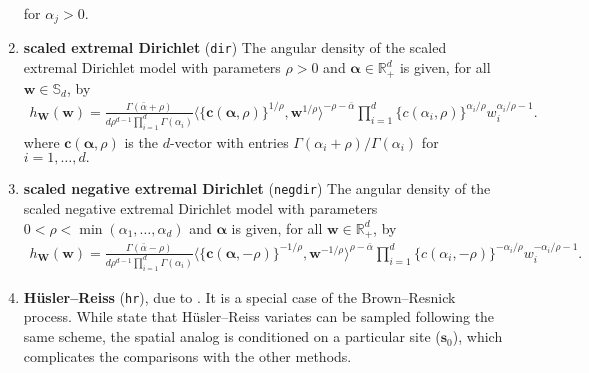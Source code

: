 \documentclass{article}
\newcommand{\bs}[1]{\boldsymbol {#1}}
\newcommand{\R}{\mathbb{R}}
\newcommand{\code}[1]{\texttt{#1}}
\begin{document}
\begin{enumerate}
for $\alpha_j>0.$ 
\item \textbf{scaled extremal Dirichlet} (\code{dir})
The angular density of the scaled extremal Dirichlet model with parameters $\rho >0$ and $\bs{\alpha} \in \R^{d}_{+}$ is given, for all $\bs{w} \in \mathbb{S}_d$, by
\begin{align*}
	h_{\bs{W}}(\bs{w})=\frac{\Gamma(\bar{\alpha}+\rho)}{d\rho^{d-1}\prod_{i=1}^d\Gamma(\alpha_i)}
\bigl\langle\{\bs{c}(\bs{\alpha},\rho)\}^{1/\rho},\bs{w}^{1/\rho}\bigr\rangle^{-\rho-\bar{\alpha}}\prod_{i=1}^{d} 
\{c(\alpha_i,\rho)\}^{\alpha_i/\rho}w_i^{\alpha_i/\rho-1}. 
\end{align*}
where $\bs{c}(\bs{\alpha},\rho)$ is the $d$-vector with entries  $\Gamma(\alpha_i+\rho)/\Gamma(\alpha_i)$ for $i=1, \ldots, d.$
\item \textbf{scaled negative extremal Dirichlet} (\code{negdir})
The angular density of the scaled negative extremal Dirichlet model with parameters $0< \rho < \min(\alpha_1,\dots, \alpha_d)$ and $\bs{\alpha}$ is given, for all $\bs{w} \in \mathbb{R}_+^d$, by
\begin{align*}
h_{\bs{W}}(\bs{w}) = 
\frac{\Gamma(\bar \alpha - \rho)}{d\rho^{d-1}\prod_{i=1}^d \Gamma(\alpha_i)} 
\bigl\langle\{\bs{c}(\bs{\alpha},-\rho)\}^{-1/\rho},\bs{w}^{-1/\rho}\bigr\rangle^{\rho-\bar \alpha}
\prod_{i=1}^d\{c(\alpha_i,-\rho)\}^{-\alpha_i/\rho}w_i^{-\alpha_i/\rho -1}. 
\end{align*}


\item \textbf{H\"usler--Reiss} (\code{hr}), due to \cite{Husler:1989}. It is a special case of the Brown--Resnick process. 
While \cite{Engelke:2015} state that H\"usler--Reiss variates can be sampled following the same scheme, the spatial analog is 
conditioned on a particular site ($\bs{s}_0$), which complicates the comparisons with the other methods. 


\end{enumerate}
\end{document}
